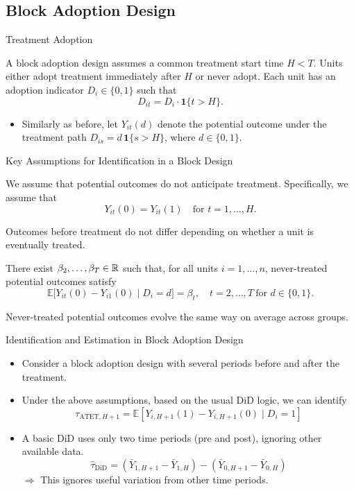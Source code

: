 \documentclass[11pt,aspectratio=169]{beamer}
\newcommand{\E}{\mathbb{E}}
\newcommand{\ind}{\mathbf{1}}
\begin{document}
\subsection{Block Adoption Design}

\begin{frame}{Treatment Adoption}
\begin{definitionbox}
A block adoption design assumes a common treatment start time $H<T$. Units either adopt treatment immediately after $H$ or never adopt. Each unit has an adoption indicator $D_i\in\{0,1\}$ such that
\[D_{it}=D_i\cdot\ind\{t>H\}.\]
\end{definitionbox}
\begin{itemize}
  \item Similarly as before, let $Y_{it}(d)$ denote the potential outcome under the treatment path $D_{is}=d\,\ind\{s>H\}$, where $d\in\{0,1\}$.
\end{itemize}
\end{frame}

\begin{frame}{Key Assumptions for Identification in a Block Design}
\small
\begin{definitionbox}
We assume that potential outcomes do not anticipate treatment. Specifically, we assume that
\[Y_{it}(0)=Y_{it}(1)\quad\text{for } t=1,\dots,H.\]
\end{definitionbox}
Outcomes before treatment do not differ depending on whether a unit is eventually treated.

\begin{definitionbox}
There exist $\beta_2,\dots,\beta_T\in\mathbb{R}$ such that, for all units $i=1,\dots,n$, never-treated potential outcomes satisfy
\[\E\bigl[Y_{it}(0)-Y_{i1}(0)\mid D_i=d\bigr]=\beta_t,\quad t=2,\dots,T\ \text{for } d\in\{0,1\}.\]
\end{definitionbox}
Never-treated potential outcomes evolve the same way on average across groups.
\end{frame}

\begin{frame}{Identification and Estimation in Block Adoption Design}
\begin{itemize}
  \item Consider a block adoption design with several periods before and after the treatment.
  \item Under the above assumptions, based on the usual DiD logic, we can identify
  \[\tau_{\text{ATET},H+1}=\E[Y_{i,H+1}(1)-Y_{i,H+1}(0)\mid D_i=1]\]
  \item A basic DiD uses only two time periods (pre and post), ignoring other available data.
  \[\widehat\tau_{\text{DiD}}=(\bar Y_{1,H+1}-\bar Y_{1,H})-(\bar Y_{0,H+1}-\bar Y_{0,H})\]
  $\Rightarrow$ This ignores useful variation from other time periods.
\end{itemize}
\end{frame}
\end{document}
